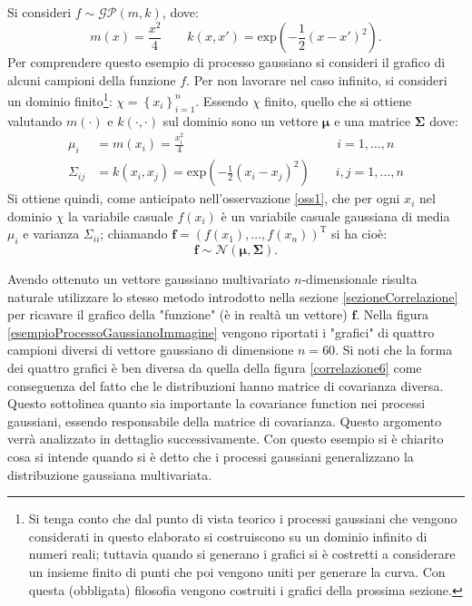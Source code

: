 \vspace{0.5cm}

\begin{ese} \label{esempioProcessoGaussiano}
Si consideri $f\sim \mathcal{GP}(m,k)$, dove:
\[
m(x)=\frac{x^2}{4}\qquad k(x,x')=\text{exp}\left( -\frac{1}{2}(x-x')^2\right).
\]
Per comprendere questo esempio di processo gaussiano si consideri il grafico di alcuni campioni della funzione $f$. Per non lavorare nel caso infinito, si consideri un dominio finito\footnote{Si tenga conto che dal punto di vista teorico i processi gaussiani che vengono considerati in questo elaborato si costruiscono su un dominio infinito di numeri reali; tuttavia quando si generano i grafici si è costretti a considerare un insieme finito di punti che poi vengono uniti per generare la curva. Con questa (obbligata) filosofia vengono costruiti i grafici della prossima sezione.\label{footnote 1}}: $\chi = \left\{x_i \right\}_{i=1}^{n}$. Essendo $\chi$ finito, quello che si ottiene valutando $m(\cdot)$ e $k(\cdot,\cdot)$ sul dominio sono un vettore $\bm{\mu}$ e una matrice $\bm{\Sigma}$ dove:
\[
\begin{split}
\mu_i&=m(x_i)=\frac{x_i^2}{4} \qquad\qquad\qquad\qquad\qquad\qquad i=1,\dots, n \\
\Sigma_{ij}&=k(x_i,x_j)=\text{exp}\left( -\frac{1}{2}(x_i-x_j)^2\right)\qquad i,j=1,\dots, n
\end{split}
\]
Si ottiene quindi, come anticipato nell'osservazione \ref{oss1}, che per ogni $x_i$ nel dominio $\chi$ la variabile casuale $f(x_i)$ è un variabile casuale gaussiana di media $\mu_i$ e varianza $\Sigma_{ii}$; chiamando $\bm{f}=(f(x_1), \dots, f(x_n))^{\text{T}}$ si ha cioè: 
\[
\bm{f}\sim \mathcal{N}(\bm{\mu}, \bm{\Sigma}).
\]

\newpage

 Avendo ottenuto un vettore gaussiano multivariato $n$-dimensionale risulta naturale utilizzare lo stesso metodo introdotto nella sezione \ref{sezioneCorrelazione} per ricavare il grafico della "funzione" (è in realtà un vettore) $\bm{f}$. Nella figura \ref{esempioProcessoGaussianoImmagine} vengono riportati i "grafici" di quattro campioni diversi di vettore gaussiano di dimensione $n=60$. Si noti che la forma dei quattro grafici è ben diversa da quella della figura \ref{correlazione6} come conseguenza del fatto che le distribuzioni hanno matrice di covarianza diversa. Questo sottolinea quanto sia importante la covariance function nei processi gaussiani, essendo responsabile della matrice di covarianza. Questo argomento verrà analizzato in dettaglio successivamente.\newline
 Con questo esempio si è chiarito cosa si intende quando si è detto che i processi gaussiani generalizzano la distribuzione gaussiana multivariata.


\end{ese}

